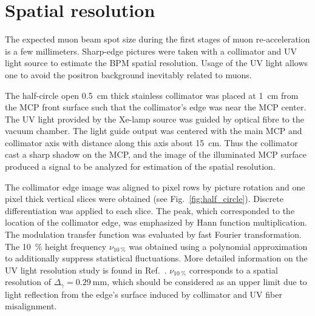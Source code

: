 \documentclass[preprint,3p,twocolumn]{elsarticle}
\begin{document}
\section{Spatial resolution}
 
The expected muon beam spot size during the first stages of muon
re-acceleration is a few millimeters.  Sharp-edge pictures were
taken with a collimator and UV light source to estimate the BPM
spatial resolution.  Usage of the UV light allows one to avoid
the positron background inevitably related to muons.

The half-circle open \SI{.5}{\cm} thick stainless collimator was
placed at \SI{1}{\cm} from the MCP front surface such that the
collimator's edge was near the MCP center.  The UV light provided
by the Xe-lamp source was guided by optical fibre to the
vacuum chamber.  The light guide output was centered with the main
MCP and collimator axis with distance along this axis about
\SI{15}{\cm}.  Thus the collimator cast a sharp shadow on the
MCP, and the image of the illuminated MCP surface produced a
signal to be analyzed for estimation of the spatial resolution.

The collimator edge image was aligned to pixel rows by picture
rotation and one pixel thick vertical slices were obtained (see
Fig.~\ref{fig:half_circle}).  Discrete differentiation was
applied to each slice.  The peak, which corresponded to the
location of the collimator edge, was emphasized by Hann function
multiplication.  The modulation transfer function was evaluated
by fast Fourier transformation.  The \SI{10}{\percent} height
frequency $\nu_{\SI{10}{\percent}}$ was obtained using a polynomial
approximation to additionally suppress statistical fluctuations.
More detailed information on the UV light resolution study is
found in Ref.~\cite{Gosha}.  $\nu_{\SI{10}{\percent}}$
corresponds to a spatial resolution of
$\Delta_\gamma = \SI{0.29}{\mm}$, which should be considered as
an upper limit due to light reflection from the edge's surface
induced by collimator and UV fiber misalignment.
\end{document}
